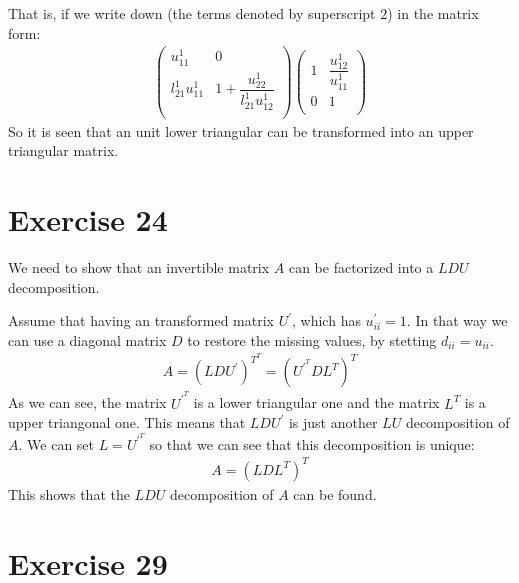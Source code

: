 That is, if we write down (the terms denoted by superscript $2$) in the matrix form:
\begin{gather*}
\left( \begin{array}{cc}
u^1_{11} & 0 \\
l^1_{21} u^1_{11} & 1 + \dfrac{u^1_{22}}{l^1_{21} u^1_{12}} \\
\end{array} \right)
\left( \begin{array}{cc}
1 & \dfrac{u^1_{12}}{u^1_{11}} \\
0 & 1 \\
\end{array} \right)
\end{gather*}
So it is seen that an unit lower triangular can be transformed into an upper triangular matrix. 

\section{Exercise 24}
We need to show that an invertible matrix $A$ can be factorized into a $LDU$ decomposition.

Assume that having an transformed matrix $U^{'}$, which has $u^{'}_{ii} = 1$. In that way we can use a diagonal matrix $D$ to restore the missing values, by stetting $d_{ii} = u_{ii}$.
\begin{gather*}
A = (LDU^{'})^{T^{T}} = (U^{{'}^T} D L^T)^{T}
\end{gather*}
As we can see, the matrix $U^{{'}^T}$  is a lower triangular one and the matrix $L^T$ is a upper triangonal one. This means that $LDU^{'}$ is just another $LU$ decomposition of $A$. We can set $L=U^{{'}^T}$ so that we can see that this decomposition is unique:
\begin{gather*}
A = {(L D L^T)}^T
\end{gather*}
This shows that the $LDU$ decomposition of $A$ can be found.

\section{Exercise 29}

